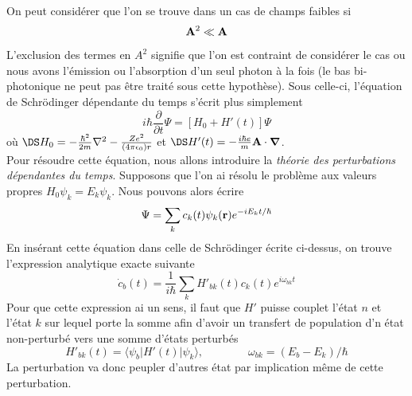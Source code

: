 On peut considérer que l'on se trouve dans un cas de champs faibles si
\begin{equation}
  {\bf A}^2 \ll {\bf A}
\end{equation}
L'exclusion des termes en $A^2$ signifie que l'on est contraint de considérer le cas ou nous avons
l'émission ou l'absorption d'un seul photon à la fois (le bas bi-photonique ne peut pas être traité
sous cette hypothèse). Sous celle-ci, l'équation de Schrödinger dépendante du temps s'écrit plus
simplement
\begin{equation}
i \hbar \frac{\partial}{\partial t} \Psi  = [ H_0 + H'(t)] \Psi
\end{equation}
où $\DS H_0 = -\frac{\hbar ^2}{2m} \nabla ^2 - \frac{Ze^2}{(4 \pi \epsilon_0) r }$ et 
$\DS H'(t) = - \frac{i \hbar e}{m} {\bf A} \cdot \mbox{\boldmath $ \nabla $}$.\\

Pour résoudre cette équation, nous allons introduire la \textit{théorie des perturbations dépendantes
du temps}. Supposons que l'on ai résolu le problème aux valeurs propres $H_0 \psi_k = E_k \psi_k$. 
Nous pouvons alors écrire 
\begin{equation}
\Psi = \sum_k c_k(t) \psi_k ({\bf r}) e^{-iE_kt/\hbar}
\end{equation}
En insérant cette équation dans celle de Schrödinger écrite ci-dessus, on trouve l'expression 
analytique exacte suivante
\begin{equation}
 \dot{c}_b(t) = \frac{1}{i \hbar} \sum_k H'_{bk} (t) c_k (t) e^{i \omega_{bk} t }
\end{equation}
Pour que cette expression ai un sens, il faut que $H'$ puisse couplet l'état $n$ et l'état $k$ sur
lequel porte la somme afin d'avoir un transfert de population d'n état non-perturbé vers une somme
d'états perturbés
\begin{equation}
 H'_{bk} (t) = \langle \psi_b \vert H'(t) \vert \psi_k \rangle,\qquad\qquad
 \omega_{bk} = (E_b - E_k) / \hbar
\end{equation}
La perturbation va donc peupler d'autres état par implication même de cette perturbation.\\

